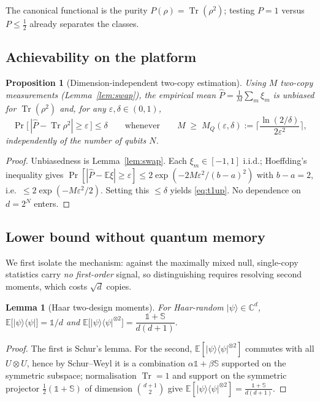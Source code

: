 \documentclass[11pt]{article}
\theoremstyle{plain}
\newtheorem{proposition}[theorem]{Proposition}
\newtheorem{lemma}[theorem]{Lemma}
\theoremstyle{definition}
\theoremstyle{remark}
\newcommand{\Tr}{\operatorname{Tr}}
\newcommand{\id}{\mathbb{1}}
\newcommand{\E}{\mathbb{E}}
\newcommand{\ket}[1]{\lvert #1 \rangle}
\newcommand{\proj}[1]{\lvert #1 \rangle\!\langle #1 \rvert}
\newcommand{\SWAP}{\mathbb{S}}
\newcommand{\eps}{\varepsilon}
\begin{document}
The canonical functional is the purity $P(\rho)=\Tr(\rho^2)$; testing $P=1$ versus $P\le\tfrac12$ already separates the classes.

\subsection{Achievability on the platform}
\begin{proposition}[Dimension-independent two-copy estimation]\label{prop:t1up}
Using $M$ two-copy measurements (Lemma~\ref{lem:swap}), the empirical mean $\widehat P=\frac1M\sum_{m}\xi_m$ is unbiased for $\Tr(\rho^2)$ and, for any $\eps,\delta\in(0,1)$,
\begin{equation}
\Pr\!\big[\,|\widehat P-\Tr\rho^2|\ge \eps\,\big]\le \delta
\qquad\text{whenever}\qquad
M\;\ge\; M_Q(\eps,\delta):=\Big\lceil \frac{\ln(2/\delta)}{2\eps^{2}}\Big\rceil,
\label{eq:t1up}
\end{equation}
\emph{independently of the number of qubits $N$}.
\end{proposition}
\begin{proof}
Unbiasedness is Lemma~\ref{lem:swap}. Each $\xi_m\in[-1,1]$ i.i.d.; Hoeffding's inequality gives $\Pr[|\widehat P-\E\xi|\ge\eps]\le 2\exp(-2M\eps^2/(b-a)^2)$ with $b-a=2$, i.e.\ $\le2\exp(-M\eps^2/2)$. Setting this $\le\delta$ yields \eqref{eq:t1up}. No dependence on $d=2^N$ enters.\end{proof}

\subsection{Lower bound without quantum memory}
We first isolate the mechanism: against the maximally mixed null, single-copy statistics carry \emph{no first-order} signal, so distinguishing requires resolving second moments, which costs $\sqrt d$ copies.

\begin{lemma}[Haar two-design moments]\label{lem:2design}
For Haar-random $\ket\psi\in\mathbb C^{d}$,
$\E\!\big[\proj\psi\big]=\id/d$ and
$\E\!\big[\proj\psi^{\otimes2}\big]=\dfrac{\id+\SWAP}{d(d+1)}.$
\end{lemma}
\begin{proof}
The first is Schur's lemma. For the second, $\E[\proj\psi^{\otimes2}]$ commutes with all $U\otimes U$, hence by Schur--Weyl it is a combination $\alpha\id+\beta\SWAP$ supported on the symmetric subspace; normalisation $\Tr=1$ and support on the symmetric projector $\tfrac12(\id+\SWAP)$ of dimension $\binom{d+1}{2}$ give $\E[\proj\psi^{\otimes2}]=\tfrac{\id+\SWAP}{d(d+1)}$.\end{proof}
\end{document}
